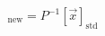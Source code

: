 \documentclass[preview]{standalone}
\begin{document}
\begin{align*}
[\vec{x}]_{\text{new}} = P^{-1} [\vec{x}]_{\text{std}}
\end{align*}
\end{document}
